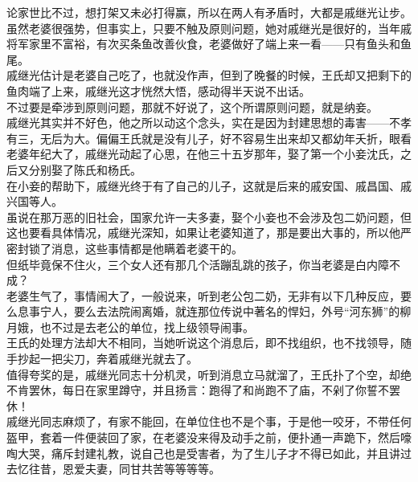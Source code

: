 \begin{multicols}{\theparacolNo}
论家世比不过，想打架又未必打得赢，所以在两人有矛盾时，大都是戚继光让步。\\

虽然老婆很强势，但事实上，只要不触及原则问题，她对戚继光是很好的，当年戚将军家里不富裕，有次买条鱼改善伙食，老婆做好了端上来一看——只有鱼头和鱼尾。\\

戚继光估计是老婆自己吃了，也就没作声，但到了晚餐的时候，王氏却又把剩下的鱼肉端了上来，戚继光这才恍然大悟，感动得半天说不出话。\\

不过要是牵涉到原则问题，那就不好说了，这个所谓原则问题，就是纳妾。\\

戚继光其实并不好色，他之所以动这个念头，实在是因为封建思想的毒害——不孝有三，无后为大。偏偏王氏就是没有儿子，好不容易生出来却又都幼年夭折，眼看老婆年纪大了，戚继光动起了心思，在他三十五岁那年，娶了第一个小妾沈氏，之后又分别娶了陈氏和杨氏。\\

在小妾的帮助下，戚继光终于有了自己的儿子，这就是后来的戚安国、戚昌国、戚兴国等人。\\

虽说在那万恶的旧社会，国家允许一夫多妻，娶个小妾也不会涉及包二奶问题，但这也要看具体情况，戚继光深知，如果让老婆知道了，那是要出大事的，所以他严密封锁了消息，这些事情都是他瞒着老婆干的。\\

但纸毕竟保不住火，三个女人还有那几个活蹦乱跳的孩子，你当老婆是白内障不成？\\

老婆生气了，事情闹大了，一般说来，听到老公包二奶，无非有以下几种反应，要么息事宁人，要么去法院闹离婚，就连那位传说中著名的悍妇，外号“河东狮”的柳月娥，也不过是去老公的单位，找上级领导闹事。\\

王氏的处理方法却大不相同，当她听说这个消息后，即不找组织，也不找领导，随手抄起一把尖刀，奔着戚继光就去了。\\

值得夸奖的是，戚继光同志十分机灵，听到消息立马就溜了，王氏扑了个空，却绝不肯罢休，每日在家里蹲守，并且扬言：跑得了和尚跑不了庙，不剁了你誓不罢休！\\

戚继光同志麻烦了，有家不能回，在单位住也不是个事，于是他一咬牙，不带任何盔甲，套着一件便装回了家，在老婆没来得及动手之前，便扑通一声跪下，然后嚎啕大哭，痛斥封建礼教，说自己也是受害者，为了生儿子才不得已如此，并且讲过去忆往昔，恩爱夫妻，同甘共苦等等等等。\\


\end{multicols}
